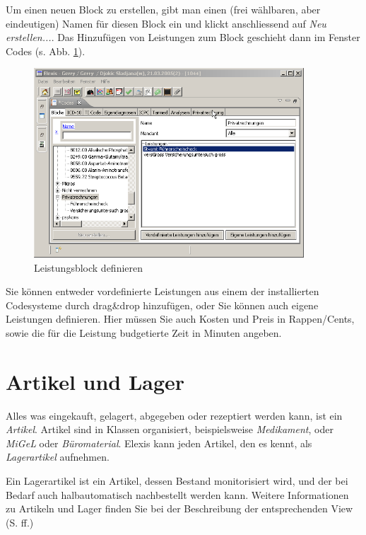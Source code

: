 Um einen neuen Block zu erstellen, gibt man einen (frei wählbaren, aber eindeutigen) Namen für diesen Block ein und klickt anschliessend auf \textit{Neu erstellen...}. Das Hinzufügen von Leistungen zum Block geschieht dann im Fenster Codes (s. Abb. \ref{fig:bloecke2}).
\begin{figure}[htp]
\includegraphics[width=0.9\textwidth]{images/block2}
\caption{Leistungsblock definieren}
\label{fig:bloecke2}
\end{figure}
Sie können entweder vordefinierte Leistungen aus einem der installierten Codesysteme durch drag\&drop hinzufügen, oder Sie können auch eigene Leistungen definieren. Hier müssen Sie auch Kosten und Preis in Rappen/Cents, sowie die für die Leistung budgetierte Zeit in Minuten angeben.


\section{Artikel und Lager}
 Alles was eingekauft, gelagert, abgegeben oder rezeptiert werden kann, ist ein \textit{Artikel}.
 Artikel sind in Klassen organisiert, beispielsweise \textit{Medikament},
 oder \textit{MiGeL} oder \textit{Büromaterial}.
 Elexis kann jeden Artikel, den es kennt, als \textit{Lagerartikel} aufnehmen.

 Ein Lagerartikel ist ein Artikel, dessen Bestand monitorisiert wird, und der bei Bedarf auch halbautomatisch nachbestellt werden kann.
 Weitere Informationen zu Artikeln und Lager finden Sie bei der Beschreibung der entsprechenden View (S. \pageref{view:artikel} ff.)

